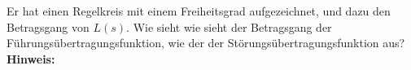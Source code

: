 \begin{question}[section=4,name={Übertragungsfunktion},difficulty=,type=mdl,tags={}]
	Er hat einen Regelkreis mit einem Freiheitsgrad aufgezeichnet, und dazu den Betragsgang von $L(s)$. Wie sieht wie sieht der Betragsgang der Führungsübertragungsfunktion, wie der der Störungsübertragungsfunktion aus?
	\\ \textbf{Hinweis:}\\
	
\end{question}
\begin{solution}
	
\end{solution}